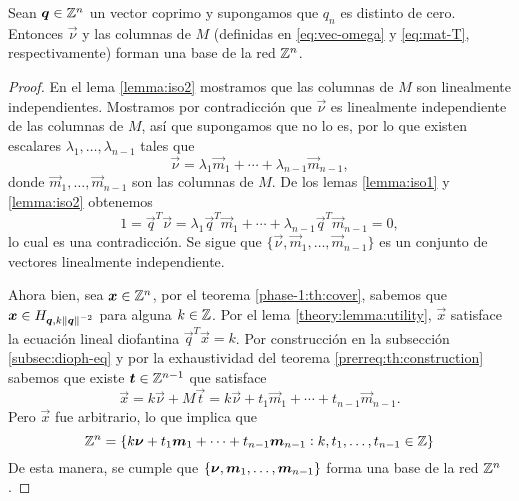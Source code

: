 \begin{theorem}
	\label{th:lattice}
	Sean $\boldsymbol{q} \in \mathbb{Z}^n$ un vector coprimo y supongamos que $q_n$ es distinto de cero. Entonces
	$\vec{\nu}$ y las columnas de $M$ (definidas en \eqref{eq:vec-omega} y \eqref{eq:mat-T},
	respectivamente) forman una base de la red $\mathbb{Z}^n$.
\end{theorem}
\begin{proof}
	En el lema \ref{lemma:iso2} mostramos que las columnas de $M$ son linealmente independientes.
	Mostramos por contradicción que $\vec{\nu}$ es linealmente independiente de las columnas de
	$M$, así que supongamos que no lo es, por lo que existen escalares $\lambda_1, \ldots,
	\lambda_{n-1}$ tales que
	\begin{equation*}
		\vec{\nu} = \lambda_1 \vec{m}_1 + \cdots + \lambda_{n-1} \vec{m}_{n-1},
	\end{equation*}
	donde $\vec{m}_1, \ldots, \vec{m}_{n-1}$ son las columnas de $M$. De los lemas \ref{lemma:iso1}
	y \ref{lemma:iso2} obtenemos
	\begin{equation*}
		1 = \vec{q}^T\vec{\nu} = \lambda_1 \vec{q}^T\vec{m}_1 + \cdots + \lambda_{n-1}
		\vec{q}^T\vec{m}_{n-1} = 0,
	\end{equation*}
	lo cual es una contradicción. Se sigue que $\lbrace \vec{\nu}, \vec{m}_1, \ldots,
	\vec{m}_{n-1}\rbrace$ es un conjunto de vectores linealmente independiente.

	Ahora bien, sea $\boldsymbol{x} \in \mathbb{Z}^n$, por el teorema \ref{phase-1:th:cover}, sabemos que $\boldsymbol{x}
	\in H_{\boldsymbol{q}, k\left\lVert \boldsymbol{q} \right\rVert^{-2}}$ para alguna $k \in \mathbb{Z}$. Por el lema \ref{theory:lemma:utility}, $\vec{x}$
	satisface la ecuación lineal diofantina $\vec{q}^T\vec{x} = k$. Por construcción en la
	subsección \ref{subsec:dioph-eq} y por la exhaustividad del teorema
	\ref{prerreq:th:construction} sabemos que existe $\boldsymbol{t} \in \mathbb{Z}^{n-1}$ que satisface
	\begin{equation*}
		\vec{x} = k\vec{\nu} + M\vec{t} = k\vec{\nu} + t_1\vec{m}_1 + \cdots +
		t_{n-1}\vec{m}_{n-1}.
	\end{equation*}
	Pero $\vec{x}$ fue arbitrario, lo que implica que
	\begin{equation*}
		\mathbb{Z}^n = \lbrace 
			k\boldsymbol{\nu} + t_1\boldsymbol{m}_1 + \cdots + t_{n-1}\boldsymbol{m}_{n-1}
		\vcentcolon k, t_1, \ldots, t_{n-1} \in \mathbb{Z} \rbrace
	\end{equation*}
	De esta manera, se cumple que $\lbrace \boldsymbol{\nu}, \boldsymbol{m}_1, \ldots, \boldsymbol{m}_{n-1} \rbrace$ forma
	una base de la red $\mathbb{Z}^n$.
\end{proof}

